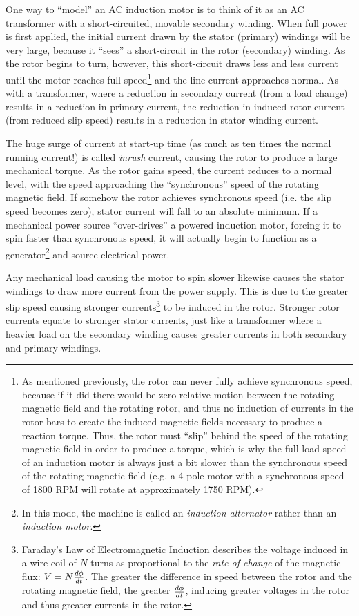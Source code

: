 One way to ``model'' an AC induction motor is to think of it as an AC transformer with a short-circuited, movable secondary winding.  When full power is first applied, the initial current drawn by the stator (primary) windings will be very large, because it ``sees'' a short-circuit in the rotor (secondary) winding.  As the rotor begins to turn, however, this short-circuit draws less and less current until the motor reaches full speed\footnote{As mentioned previously, the rotor can never fully achieve synchronous speed, because if it did there would be zero relative motion between the rotating magnetic field and the rotating rotor, and thus no induction of currents in the rotor bars to create the induced magnetic fields necessary to produce a reaction torque.  Thus, the rotor must ``slip'' behind the speed of the rotating magnetic field in order to produce a torque, which is why the full-load speed of an induction motor is always just a bit slower than the synchronous speed of the rotating magnetic field (e.g. a 4-pole motor with a synchronous speed of 1800 RPM will rotate at approximately 1750 RPM).} and the line current approaches normal.  As with a transformer, where a reduction in secondary current (from a load change) results in a reduction in primary current, the reduction in induced rotor current (from reduced slip speed) results in a reduction in stator winding current.  

The huge surge of current at start-up time (as much as ten times the normal running current!) is called \textit{inrush} current, causing the rotor to produce a large mechanical torque.  As the rotor gains speed, the current reduces to a normal level, with the speed approaching the ``synchronous'' speed of the rotating magnetic field.  If somehow the rotor achieves synchronous speed (i.e. the slip speed becomes zero), stator current will fall to an absolute minimum.  If a mechanical power source ``over-drives'' a powered induction motor, forcing it to spin faster than synchronous speed, it will actually begin to function as a generator\footnote{In this mode, the machine is called an \textit{induction alternator} rather than an \textit{induction motor}.} and source electrical power.    

Any mechanical load causing the motor to spin slower likewise causes the stator windings to draw more current from the power supply.  This is due to the greater slip speed causing stronger currents\footnote{Faraday's Law of Electromagnetic Induction describes the voltage induced in a wire coil of $N$ turns as proportional to the \textit{rate of change} of the magnetic flux: $V = N {d \phi \over dt}$.  The greater the difference in speed between the rotor and the rotating magnetic field, the greater ${d \phi \over dt}$, inducing greater voltages in the rotor and thus greater currents in the rotor.} to be induced in the rotor.  Stronger rotor currents equate to stronger stator currents, just like a transformer where a heavier load on the secondary winding causes greater currents in both secondary and primary windings.  

